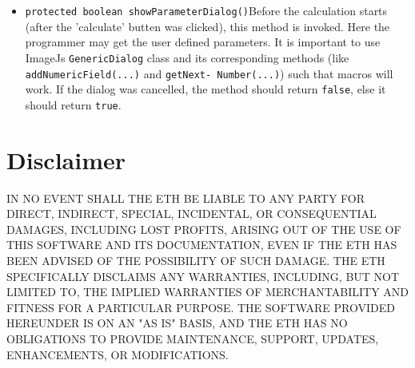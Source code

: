 \documentclass{scrartcl}
\begin{document}
\begin{itemize}
\item{\lstinline{protected boolean showParameterDialog()}}Before the calculation starts (after the 'calculate' butten was clicked), this method is invoked. Here the programmer may get the user defined parameters. It is important to use ImageJs \texttt{GenericDialog} class and its corresponding methods (like \texttt{addNumericField(...)} and \texttt{getNext-\hspace{0pt}
Number(...)}) such that macros will work. If the dialog was cancelled, the method should return \texttt{false}, else it should return \texttt{true}.

\end{itemize}

\section{Disclaimer}
IN NO EVENT SHALL THE ETH BE LIABLE TO ANY PARTY FOR DIRECT, INDIRECT, SPECIAL, INCIDENTAL, OR CONSEQUENTIAL DAMAGES, INCLUDING LOST PROFITS, ARISING OUT OF THE USE OF THIS SOFTWARE AND ITS DOCUMENTATION, EVEN IF THE ETH HAS BEEN ADVISED OF THE POSSIBILITY OF SUCH DAMAGE. THE ETH SPECIFICALLY DISCLAIMS ANY WARRANTIES, INCLUDING, BUT NOT LIMITED TO, THE IMPLIED WARRANTIES OF MERCHANTABILITY AND FITNESS FOR A PARTICULAR PURPOSE. THE SOFTWARE PROVIDED HEREUNDER IS ON AN "AS IS" BASIS, AND THE ETH HAS NO OBLIGATIONS TO PROVIDE MAINTENANCE, SUPPORT, UPDATES, ENHANCEMENTS, OR MODIFICATIONS.


%
%
\end{document}
